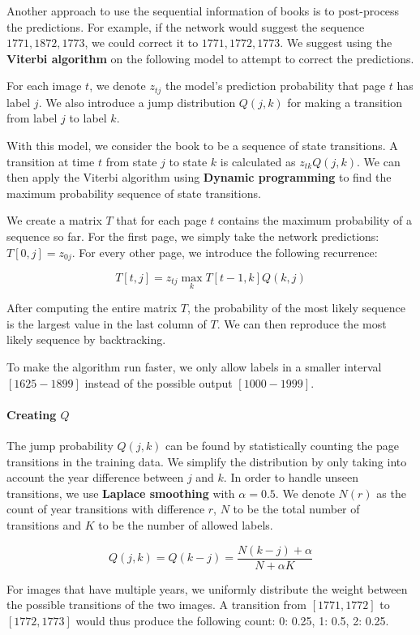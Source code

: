 Another approach to use the sequential information of books is to post-process the predictions. For example, if the network would suggest the sequence $1771, 1872, 1773$, we could correct it to $1771, 1772, 1773$. We suggest using the \textbf{Viterbi algorithm} on the following model to attempt to correct the predictions.

For each image $t$, we denote $z_{tj}$ the model's prediction probability that page $t$ has label $j$. We also introduce a jump distribution $Q(j, k)$ for making a transition from label $j$ to label $k$.

With this model, we consider the book to be a sequence of state transitions. A transition at time $t$ from state $j$ to state $k$ is calculated as $z_{tk} Q(j, k)$. We can then apply the Viterbi algorithm using \textbf{Dynamic programming} to find the maximum probability sequence of state transitions.

We create a matrix $T$ that for each page $t$ contains the maximum probability of a sequence so far. For the first page, we simply take the network predictions: $T[0,j] = z_{0j}$. For every other page, we introduce the following recurrence:

\[
T[t,j] = z_{tj} \max_k{ T[t-1,k] Q(k, j) }
\]

After computing the entire matrix $T$, the probability of the most likely sequence is the largest value in the last column of $T$. We can then reproduce the most likely sequence by backtracking.

To make the algorithm run faster, we only allow labels in a smaller interval $[1625-1899]$ instead of the possible output $[1000-1999]$.

\paragraph{Creating $Q$}
The jump probability $Q(j, k)$ can be found by statistically counting the page transitions in the training data. We simplify the distribution by only taking into account the year difference between $j$ and $k$. In order to handle unseen transitions, we use \textbf{Laplace smoothing} with $\alpha=0.5$. We denote $N(r)$ as the count of year transitions with difference $r$, $N$ to be the total number of transitions and $K$ to be the number of allowed labels.

\[
Q(j, k) = Q(k-j) = \frac{N(k-j) + \alpha}{N + \alpha K}
\]

For images that have multiple years, we uniformly distribute the weight between the possible transitions of the two images. A transition from $[1771, 1772]$ to $[1772, 1773]$ would thus produce the following count: {0: 0.25, 1: 0.5, 2: 0.25}.


